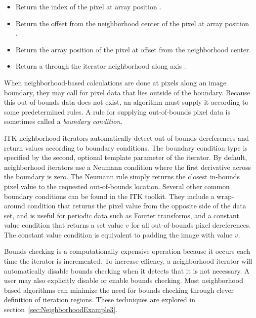 {\begin{itemize}
\item \textbf{} Return the
 index of the pixel at array position .

\item \textbf{}  Return the offset
from the neighborhood center of the pixel at array position .

\item \textbf{} Return
the array position of the pixel at offset  from the neighborhood center.

\item \textbf{} Return a
 through the iterator neighborhood along axis .

\end{itemize}

When neighborhood-based calculations are done at pixels along an image
boundary, they may call for pixel data that lies outside of the boundary.
Because this out-of-bounds data does not exist, an algorithm must supply it
according to some predetermined rules.  A rule for supplying out-of-bounds
pixel data is sometimes called a \emph{boundary condition}.
 
ITK neighborhood iterators automatically detect out-of-bounds dereferences and
return values according to boundary conditions.  The boundary condition type is
specified by the second, optional template parameter of the iterator.  By
default, neighborhood iterators use a Neumann condition where the first
derivative across the boundary is zero.  The Neumann rule simply returns the
closest in-bounds pixel value to the requested out-of-bounds location.  Several
other common boundary conditions can be found in the ITK toolkit.  They include
a wrap-around condition that returns the pixel value from the opposite side of
the data set, and is useful for periodic data such as Fourier transforms, and a
constant value condition that returns a set value $v$ for all out-of-bounds pixel
dereferences.  The constant value condition is equivalent to padding the image
with value $v$.

Bounds checking is a computationally expensive operation because it occurs each
time the iterator is incremented.  To increase effiency, a neighborhood
iterator will automatically disable bounds checking when it detects that it is
not necessary.  A user may also explicitly disable or enable bounds checking.
Most neighborhood based algorithms can minimize the need for bounds checking
through clever definition of iteration regions.  These techniques are explored
in section~\ref{sec:NeighborhoodExample3}.

}
